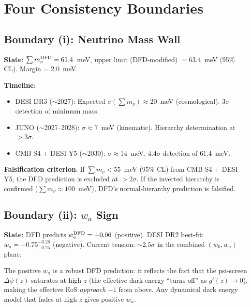 \documentclass[11pt,a4paper]{article}
\newcounter{findingctr}
\newenvironment{finding}[1][]{%
  \refstepcounter{findingctr}%
  \begin{tcolorbox}[colback=blue!3!white, colframe=blue!50!black,
    title=\textbf{Finding \thefindingctr: #1}]
}{%
  \end{tcolorbox}%
}
\newcommand{\Dpsi}{\Delta\psi}
\begin{document}
\section{Four Consistency Boundaries}

\begin{finding}[\textbf{Framework Limits}: Four Falsifiable Boundaries]
\label{find:limits}

\subsection*{Boundary (i): Neutrino Mass Wall}

\textbf{State}: $\sum m_\nu^{\rm DFD} = 61.4$~meV, upper limit
(DFD-modified) $= 63.4$~meV (95\% CL).  Margin = 2.0~meV.

\textbf{Timeline}:
\begin{itemize}[nosep]
\item DESI DR3 ($\sim$2027): Expected $\sigma(\sum m_\nu) \approx
  20$~meV (cosmological).  $3\sigma$ detection of minimum mass.
\item JUNO ($\sim$2027--2028): $\sigma \approx 7$~meV (kinematic).
  Hierarchy determination at $> 3\sigma$.
\item CMB-S4 + DESI Y5 ($\sim$2030): $\sigma \approx 14$~meV.
  $4.4\sigma$ detection of $61.4$~meV.
\end{itemize}

\textbf{Falsification criterion}: If $\sum m_\nu < 55$~meV (95\% CL)
from CMB-S4 + DESI Y5, the DFD prediction is excluded at $> 2\sigma$.
If the inverted hierarchy is confirmed ($\sum m_\nu \approx 100$~meV),
DFD's normal-hierarchy prediction is falsified.

\subsection*{Boundary (ii): $w_a$ Sign}

\textbf{State}: DFD predicts $w_a^{\rm DFD} = +0.06$ (positive).
DESI DR2 best-fit: $w_a = -0.75^{+0.28}_{-0.25}$ (negative).
Current tension: $\sim 2.5\sigma$ in the combined $(w_0, w_a)$ plane.

The positive $w_a$ is a robust DFD prediction: it reflects the fact
that the psi-screen $\Dpsi(z)$ saturates at high $z$ (the effective
dark energy ``turns off'' as $g'(z) \to 0$), making the effective
EoS \emph{approach} $-1$ from above.  Any dynamical dark energy model
that fades at high $z$ gives positive $w_a$.


\end{finding}
\end{document}
